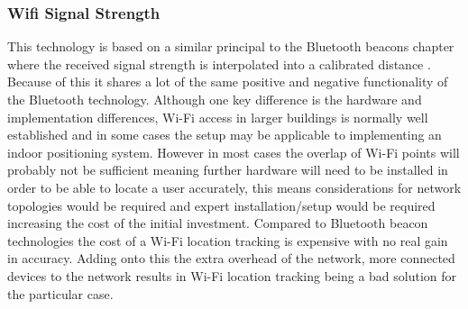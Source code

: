 \subsubsection{Wifi Signal Strength}
This technology is based on a similar principal to the Bluetooth beacons chapter where the received signal strength is interpolated into a calibrated distance \citetemp. Because of this it shares a lot of the same positive and negative functionality of the Bluetooth technology. Although one key difference is the hardware and implementation differences, Wi-Fi access in larger buildings is normally well established and in some cases the setup may be applicable to implementing an indoor positioning system. However in most cases the overlap of Wi-Fi points will probably not be sufficient meaning further hardware will need to be installed in order to be able to locate a user accurately, this means considerations for network topologies would be required and expert installation/setup would be required increasing the cost of the initial investment. Compared to Bluetooth beacon technologies the cost of a Wi-Fi location tracking is expensive with no real gain in accuracy. Adding onto this the extra overhead of the network, more connected devices to the network results in Wi-Fi location tracking being a bad solution for the particular case.